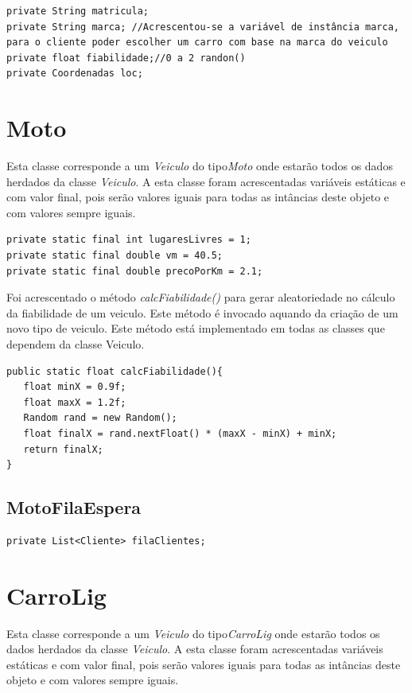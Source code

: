 \begin{verbatim}
private String matricula; 
private String marca; //Acrescentou-se a variável de instância marca, 
para o cliente poder escolher um carro com base na marca do veiculo
private float fiabilidade;//0 a 2 randon()
private Coordenadas loc;
\end{verbatim}

\section{Moto}
Esta classe corresponde a um \textit{Veiculo} do tipo\textit{Moto} onde estarão todos os dados herdados da classe \textit{Veiculo}. A esta classe foram acrescentadas variáveis estáticas e com valor final, pois serão valores iguais para todas as intâncias deste objeto e com valores sempre iguais. 

\begin{verbatim}
private static final int lugaresLivres = 1;
private static final double vm = 40.5; 
private static final double precoPorKm = 2.1;
\end{verbatim}

Foi acrescentado o método \textit{calcFiabilidade()} para gerar aleatoriedade no cálculo da fiabilidade de um veiculo. Este método é invocado aquando da criação de um novo tipo de veiculo. Este método está implementado em todas as classes que dependem da classe Veiculo.
\begin{verbatim}
public static float calcFiabilidade(){
   float minX = 0.9f;
   float maxX = 1.2f;
   Random rand = new Random();
   float finalX = rand.nextFloat() * (maxX - minX) + minX;
   return finalX;  
}
\end{verbatim}

\subsection{MotoFilaEspera}
\begin{verbatim}
private List<Cliente> filaClientes;
\end{verbatim}

\section{CarroLig}
Esta classe corresponde a um \textit{Veiculo} do tipo\textit{CarroLig} onde estarão todos os dados herdados da classe \textit{Veiculo}. A esta classe foram acrescentadas variáveis estáticas e com valor final, pois serão valores iguais para todas as intâncias deste objeto e com valores sempre iguais. 

